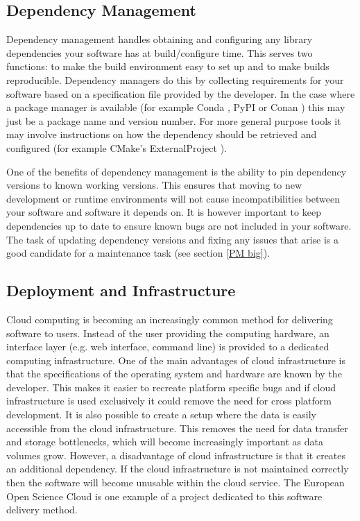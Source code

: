 \documentclass[jnr]{iosart2x}
\begin{document}
\subsection{Dependency Management}
\label{Dependency Management}

Dependency management handles obtaining and configuring any library dependencies your software has at build/configure time.
This serves two functions: to make the build environment easy to set up and to make builds reproducible.
Dependency managers do this by collecting requirements for your software based on a specification file provided by the developer.
In the case where a package manager is available (for example Conda \cite{Conda}, PyPI \cite{PyPI} or Conan \cite{Conan}) this may just be a package name and version number.
For more general purpose tools it may involve instructions on how the dependency should be retrieved and configured (for example CMake's ExternalProject \cite{CMake_ExternalProject}).

One of the benefits of dependency management is the ability to pin dependency versions to known working versions.
This ensures that moving to new development or runtime environments will not cause incompatibilities between your software and software it depends on.
It is however important to keep dependencies up to date to ensure known bugs are not included in your software.
The task of updating dependency versions and fixing any issues that arise is a good candidate for a maintenance task (see section \ref{PM big}).

\subsection{Deployment and Infrastructure}
\label{Infrastructure}

Cloud computing is becoming an increasingly common method for delivering software to users.
Instead of the user providing the computing hardware, an interface layer (e.g. web interface, command line) is provided to a dedicated computing infrastructure.
One of the main advantages of cloud infrastructure is that the specifications of the operating system and hardware are known by the developer.
This makes it easier to recreate platform specific bugs and if cloud infrastructure is used exclusively it could remove the need for cross platform development.
It is also possible to create a setup where the data is easily accessible from the cloud infrastructure.
This removes the need for data transfer and storage bottlenecks, which will become increasingly important as data volumes grow.
However, a disadvantage of cloud infrastructure is that it creates an additional dependency.
If the cloud infrastructure is not maintained correctly then the software will become unusable within the cloud service.
The European Open Science Cloud \cite{EOSC} is one example of a project dedicated to this software delivery method.
\end{document}
